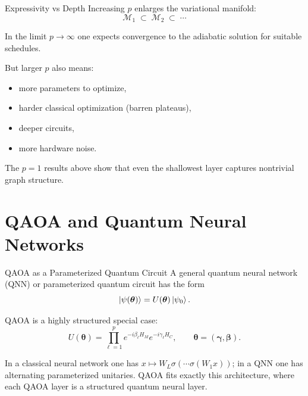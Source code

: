 \documentclass[aspectratio=169]{beamer}
\begin{document}
\begin{frame}{Expressivity vs Depth}
Increasing \(p\) enlarges the variational manifold:
\[
\mathcal{M}_1 \;\subset\; \mathcal{M}_2 \;\subset\; \cdots
\]

In the limit \(p\to\infty\) one expects convergence to the adiabatic solution
for suitable schedules.

But larger \(p\) also means:
\begin{itemize}
    \item more parameters to optimize,
    \item harder classical optimization (barren plateaus),
    \item deeper circuits,
    \item more hardware noise.
\end{itemize}

The \(p=1\) results above show that even the shallowest layer captures
nontrivial graph structure.
\end{frame}

\section{QAOA and Quantum Neural Networks}

\begin{frame}{QAOA as a Parameterized Quantum Circuit}
A general quantum neural network (QNN) or parameterized quantum circuit has
the form
\[
\ket{\psi(\bm{\theta})}=U(\bm{\theta})\ket{\psi_0}.
\]

QAOA is a highly structured special case:
\[
U(\bm{\theta})
=
\prod_{\ell=1}^p e^{-i\beta_\ell H_M}e^{-i\gamma_\ell H_C},
\qquad
\bm{\theta}=(\bm{\gamma},\bm{\beta}).
\]

In a classical neural network one has
\(x\mapsto W_L\sigma(\cdots\sigma(W_1 x))\);
in a QNN one has alternating parameterized unitaries.
QAOA fits exactly this architecture, where each QAOA layer is a structured
quantum neural layer.
\end{frame}
\end{document}
